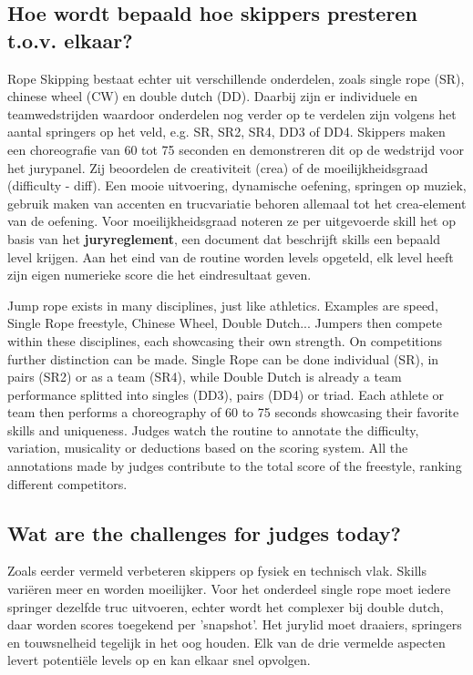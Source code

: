 \subsection{Hoe wordt bepaald hoe skippers presteren t.o.v. elkaar?}

Rope Skipping bestaat echter uit verschillende onderdelen, zoals single rope (SR), chinese wheel (CW) en double dutch (DD). Daarbij zijn er individuele en teamwedstrijden waardoor onderdelen nog verder op te verdelen zijn volgens het aantal springers op het veld, e.g. SR, SR2, SR4, DD3 of DD4. Skippers maken een choreografie van 60 tot 75 seconden en demonstreren dit op de wedstrijd voor het jurypanel. Zij beoordelen de creativiteit (crea) of de moeilijkheidsgraad (difficulty - diff). Een mooie uitvoering, dynamische oefening, springen op muziek, gebruik maken van accenten en trucvariatie behoren allemaal tot het crea-element van de oefening. Voor moeilijkheidsgraad noteren ze per uitgevoerde skill het op basis van het \textbf{juryreglement}, een document dat beschrijft skills een bepaald level krijgen. Aan het eind van de routine worden levels opgeteld, elk level heeft zijn eigen numerieke score die het eindresultaat geven.

Jump rope exists in many disciplines, just like athletics. Examples are speed, Single Rope freestyle, Chinese Wheel, Double Dutch...
Jumpers then compete within these disciplines, each showcasing their own strength. On competitions further distinction can be made. Single Rope can be done individual (SR), in pairs (SR2) or as a team (SR4), while Double Dutch is already a team performance splitted into singles (DD3), pairs (DD4) or triad.
Each athlete or team then performs a choreography of 60 to 75 seconds showcasing their favorite skills and uniqueness. Judges watch the routine to annotate the difficulty, variation, musicality or deductions based on the scoring system. All the annotations made by judges contribute to the total score of the freestyle, ranking different competitors.

\subsection{Wat are the challenges for judges today?}

Zoals eerder vermeld verbeteren skippers op fysiek en technisch vlak. Skills variëren meer en worden moeilijker. Voor het onderdeel single rope moet iedere springer dezelfde truc uitvoeren, echter wordt het complexer bij double dutch, daar worden scores toegekend per 'snapshot'. Het jurylid moet draaiers, springers en touwsnelheid tegelijk in het oog houden. Elk van de drie vermelde aspecten levert potentiële levels op en kan elkaar snel opvolgen.

